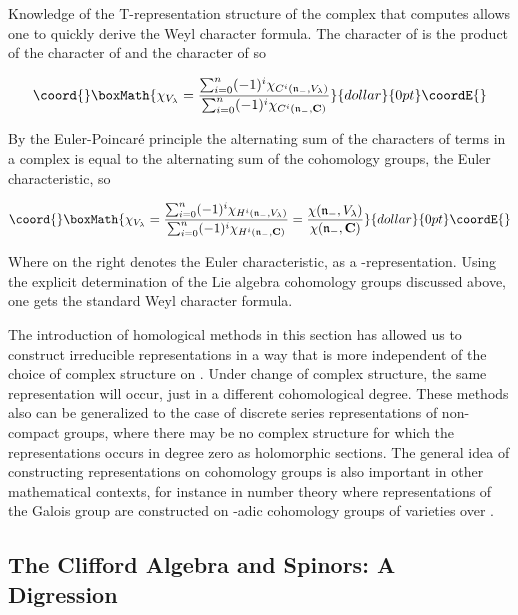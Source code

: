 \documentclass[a4paper,a4paper]{article}
\theoremstyle{conjecture}
\begin{document}
Knowledge of the T-representation structure of the complex that computes \coordHE{} allows one to quickly derive the Weyl character formula.  The character
of \coordHE{} is the product of the character of
\coordHE{} and the character of \coordHE{} so

$$\coord{}\boxMath{\chi_{V_\lambda}=\frac{\sum_{i=0}^n(-1)^i \chi_{C^i(\mathfrak n_-,V_\lambda)}}
{\sum_{i=0}^n(-1)^i \chi_{C^i(\mathfrak n_-,\mathbf C)}}}{dollar}{0pt}\coordE{}$$

By the Euler-Poincar\'e principle the alternating sum of the characters of terms
in a complex is equal to the alternating sum of the cohomology groups, the Euler
characteristic, so

$$\coord{}\boxMath{\chi_{V_\lambda}=\frac{\sum_{i=0}^n(-1)^i \chi_{H^i(\mathfrak n_-,V_\lambda)}}
{\sum_{i=0}^n(-1)^i \chi_{H^i(\mathfrak n_-,\mathbf C)}}=\frac{\chi({\mathfrak n}_-,V_\lambda)}
{\chi({\mathfrak n}_-,\mathbf C)}}{dollar}{0pt}\coordE{}$$

Where on the right \myHighlight{$\chi$}\coordHE{} denotes the Euler characteristic, as a \coordHE{}-representation.  Using
the explicit determination of the Lie algebra cohomology groups discussed above, one gets
the standard Weyl character formula.

The introduction of homological methods in this section has allowed us to construct irreducible
representations in a way that is more independent of the choice of complex structure on
\coordHE{}.  Under change of complex structure, the same representation will occur, just in
a different cohomological degree.  These methods also can be generalized to the case of
discrete series representations of non-compact groups, where there may be no complex structure for
which the representations
occurs in degree zero as holomorphic sections.  The general idea of constructing representations
on cohomology groups is also important in other mathematical contexts, for instance in number
theory where representations of the Galois group \coordHE{} are constructed
on \coordHE{}-adic cohomology groups of varieties over \coordHE{}.


\subsection{The Clifford Algebra and Spinors: A Digression}
\end{document}

